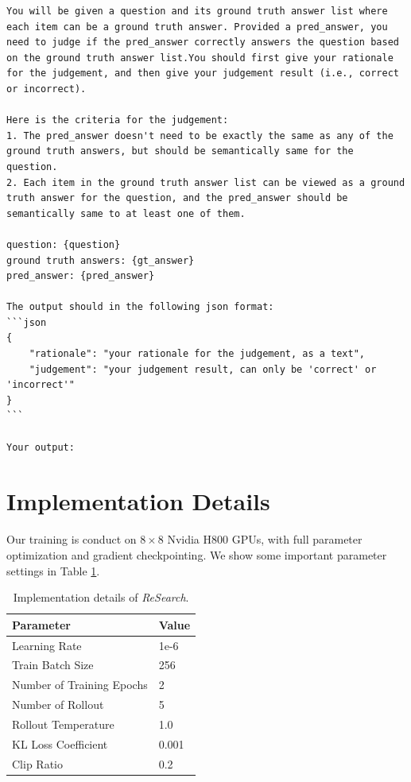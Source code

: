 \documentclass{article}
\begin{document}
\begin{tcolorbox}[title=Prompt for Extracting Scenarios]
\begin{lstlisting}[language=prompt]
You will be given a question and its ground truth answer list where each item can be a ground truth answer. Provided a pred_answer, you need to judge if the pred_answer correctly answers the question based on the ground truth answer list.You should first give your rationale for the judgement, and then give your judgement result (i.e., correct or incorrect).

Here is the criteria for the judgement:
1. The pred_answer doesn't need to be exactly the same as any of the ground truth answers, but should be semantically same for the question.
2. Each item in the ground truth answer list can be viewed as a ground truth answer for the question, and the pred_answer should be semantically same to at least one of them.

question: {question}
ground truth answers: {gt_answer}
pred_answer: {pred_answer}

The output should in the following json format:
```json 
{
    "rationale": "your rationale for the judgement, as a text",
    "judgement": "your judgement result, can only be 'correct' or 'incorrect'"
}
```

Your output:
\end{lstlisting}
\end{tcolorbox}

\section{Implementation Details}
\label{app:implementation-details}

Our training is conduct on $8\times8$ Nvidia H800 GPUs, with full parameter optimization and gradient checkpointing. We show some important parameter settings in Table \ref{tab:implementation-details}.

\begin{table}[htbp]
\caption{Implementation details of \textit{ReSearch}.}
\label{tab:implementation-details}
\begin{center}
\begin{tabular}{l|l}
\toprule
\textbf{Parameter} & \textbf{Value} \\
\midrule
Learning Rate & 1e-6 \\
Train Batch Size & 256 \\
Number of Training Epochs & 2 \\
Number of Rollout & 5 \\
Rollout Temperature & 1.0 \\
KL Loss Coefficient & 0.001 \\
Clip Ratio & 0.2 \\
\bottomrule
\end{tabular}
\end{center}
\end{table}
\end{document}

